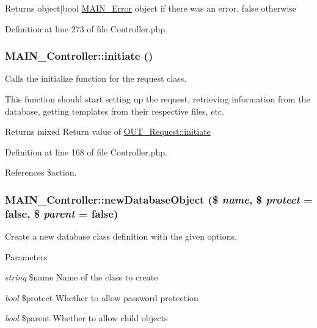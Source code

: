 \begin{DoxyReturn}{Returns}
object$|$bool \hyperlink{classMAIN__Error}{MAIN\_\-Error} object if there was an error, false otherwise 
\end{DoxyReturn}


Definition at line 273 of file Controller.php.\hypertarget{classMAIN__Controller_a63a01965c1673fbdbe5eb374ddf5c8d6}{
\subsubsection[{initiate}]{\setlength{\rightskip}{0pt plus 5cm}MAIN\_\-Controller::initiate ()}}
\label{d0/d6f/classMAIN__Controller_a63a01965c1673fbdbe5eb374ddf5c8d6}
Calls the initialize function for the request class.

This function should start setting up the request, retrieving information from the database, getting templates from their respective files, etc.

\begin{DoxyReturn}{Returns}
mixed Return value of \hyperlink{classOUT__Request_a825f77601714b2cb7510ab65d2d71483}{OUT\_\-Request::initiate} 
\end{DoxyReturn}


Definition at line 168 of file Controller.php.

References \$action.\hypertarget{classMAIN__Controller_abdf41ec9c3425b16d70236e0fe497b9f}{
\subsubsection[{newDatabaseObject}]{\setlength{\rightskip}{0pt plus 5cm}MAIN\_\-Controller::newDatabaseObject (\$ {\em name}, \/  \$ {\em protect} = {\ttfamily false}, \/  \$ {\em parent} = {\ttfamily false})}}
\label{d0/d6f/classMAIN__Controller_abdf41ec9c3425b16d70236e0fe497b9f}
Create a new database class definition with the given options.


\begin{DoxyParams}{Parameters}
\item[{\em string}]\$name Name of the class to create \item[{\em bool}]\$protect Whether to allow password protection \item[{\em bool}]\$parent Whether to allow child objects \end{DoxyParams}


